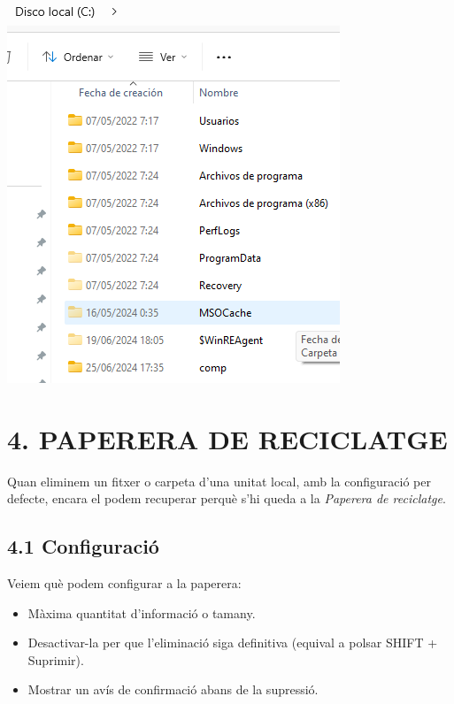 \documentclass[
  a4paper,
]{article}
\providecommand{\tightlist}{%
  \setlength{\itemsep}{0pt}\setlength{\parskip}{0pt}}
\begin{document}
\includegraphics{png/carpetesPrincipalsCreadesDespres.png}

\section{4. PAPERERA DE RECICLATGE}\label{paperera-de-reciclatge}

Quan eliminem un fitxer o carpeta d'una unitat local, amb la
configuració per defecte, encara el podem recuperar perquè s'hi queda a
la \emph{Paperera de reciclatge}.

\subsection{4.1 Configuració}\label{configuraciuxf3}

Veiem què podem configurar a la paperera:

\begin{itemize}
\tightlist
\item
  Màxima quantitat d'informació o tamany.
\item
  Desactivar-la per que l'eliminació siga definitiva (equival a polsar
  SHIFT + Suprimir).
\item
  Mostrar un avís de confirmació abans de la supressió.
\end{itemize}
\end{document}
